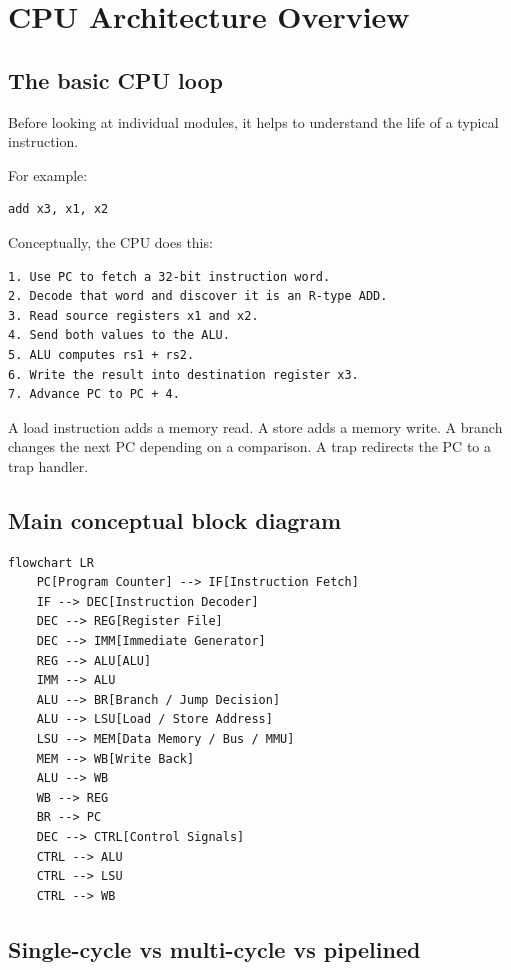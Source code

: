 \section{CPU Architecture Overview}

\subsection{The basic CPU loop}

Before looking at individual modules, it helps to understand the life of a typical instruction.

For example:

\begin{lstlisting}[language={}]
add x3, x1, x2
\end{lstlisting}

Conceptually, the CPU does this:

\begin{lstlisting}[language={}]
1. Use PC to fetch a 32-bit instruction word.
2. Decode that word and discover it is an R-type ADD.
3. Read source registers x1 and x2.
4. Send both values to the ALU.
5. ALU computes rs1 + rs2.
6. Write the result into destination register x3.
7. Advance PC to PC + 4.
\end{lstlisting}

A load instruction adds a memory read. A store adds a memory write. A branch changes the next PC depending on a comparison. A trap redirects the PC to a trap handler.

\subsection{Main conceptual block diagram}

\begin{lstlisting}[language={},caption={Mermaid diagram source}]
flowchart LR
    PC[Program Counter] --> IF[Instruction Fetch]
    IF --> DEC[Instruction Decoder]
    DEC --> REG[Register File]
    DEC --> IMM[Immediate Generator]
    REG --> ALU[ALU]
    IMM --> ALU
    ALU --> BR[Branch / Jump Decision]
    ALU --> LSU[Load / Store Address]
    LSU --> MEM[Data Memory / Bus / MMU]
    MEM --> WB[Write Back]
    ALU --> WB
    WB --> REG
    BR --> PC
    DEC --> CTRL[Control Signals]
    CTRL --> ALU
    CTRL --> LSU
    CTRL --> WB
\end{lstlisting}

\subsection{Single-cycle vs multi-cycle vs pipelined}

